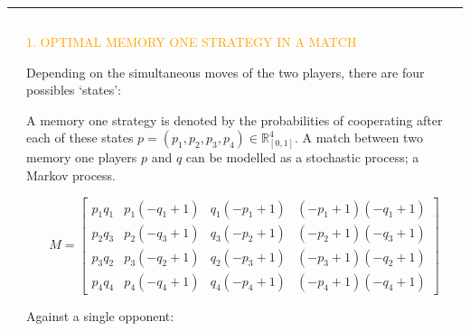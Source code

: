 \documentclass[usenames,dvipsnames,t]{beamer}
\newcommand{\R}{\mathbb{R}}
\begin{document}
\hrule height 5pt
\begin{columns}
    \begin{column}{.05\linewidth}
    \end{column}
    \begin{column}{.4\linewidth}
        \vspace{0.9cm}

        \begin{center}
        \textcolor{orange}{\large{1. OPTIMAL MEMORY ONE STRATEGY IN A MATCH}}
        \end{center}
        \vspace{0.3cm}

        \small{
        Depending on the simultaneous moves of the two players, there are four
        possibles `states':}

        \begin{center}
            
        \end{center}

        \small{
        A memory one strategy is denoted by the probabilities of cooperating after each of these states \(p = (p_1, p_2, p_3, p_4) \in \R_{[0,1]} ^ 4\). A match between
        two memory one players \(p\) and \(q\) can be modelled as a stochastic
        process; a Markov process.}

        \begin{equation*}
        M = \left[\begin{matrix}p_{1} q_{1} & p_{1} \left(- q_{1} + 1\right) & q_{1} \left(- p_{1} + 1\right) & \left(- p_{1} + 1\right) \left(- q_{1} + 1\right)\\
        p_{2} q_{3} & p_{2} \left(- q_{3} + 1\right) & q_{3} \left(- p_{2} + 1\right) & \left(- p_{2} + 1\right) \left(- q_{3} + 1\right)\\
        p_{3} q_{2} & p_{3} \left(- q_{2} + 1\right) & q_{2} \left(- p_{3} + 1\right) & \left(- p_{3} + 1\right) \left(- q_{2} + 1\right)\\
        p_{4} q_{4} & p_{4} \left(- q_{4} + 1\right) & q_{4} \left(- p_{4} + 1\right) & \left(- p_{4} + 1\right) \left(- q_{4} + 1\right)\end{matrix}\right]
        \end{equation*}
        \vspace{0.5cm}

        \textcolor{solarizedGreen}{Against a single opponent:}
        \vspace{0.3cm}


\end{column}
\end{columns}
\end{document}
